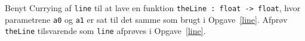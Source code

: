\label{theLine} Benyt Currying af \lstinline{line} til at lave en funktion \lstinline{theLine : float -> float}, hvor parametrene \lstinline{a0} og \lstinline{a1} er sat til det samme som brugt i Opgave~\ref{line}. Afprøv \lstinline{theLine} tilsvarende som \lstinline{line} afprøves i Opgave~\ref{line}.
